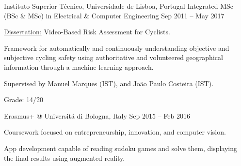  \cventry
    {Instituto Superior Técnico, Universidade de Lisboa, Portugal} %
    {Integrated MSc (BSc \& MSc) in Electrical \& Computer Engineering} %
    {Sep 2011 – May 2017} %
    {
      \begin{cvitems} %
        \item {\underline{Dissertation:} Video-Based Risk Assessment for Cyclists.}
        \item {Framework for automatically and continuously understanding objective and subjective cycling safety using authoritative and volunteered geographical information through a machine learning approach.}
        \item {Supervised by Manuel Marques (IST), and João Paulo Costeira (IST).}
      \end{cvitems}
    }
    {
        Grade: 14/20
    }

  \cventryinner
    {Erasmus+ @ Universitá di Bologna, Italy} %
    {Sep 2015 – Feb 2016} %
    {
    	\begin{cvitems} %
    		\item {Coursework focused on entrepreneurship, innovation, and computer vision.}
    		\item {App development capable of reading sudoku games and solve them, displaying the final results using augmented reality.}
    	\end{cvitems}
    }
    { 	
    }
 
